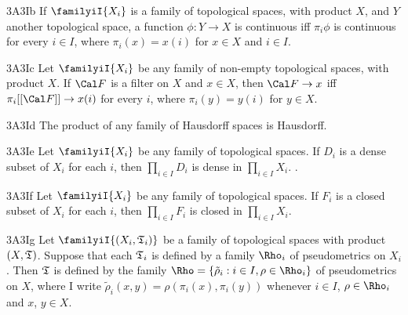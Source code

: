 \spheader 3A3Ib If $\familyiI{X_i}$ is a family of
topological spaces, with product $X$, and $Y$ another topological
space, a function $\phi:Y\to X$ is continuous iff $\pi_i\phi$ is
continuous for every $i\in I$, where $\pi_i(x)=x(i)$ for $x\in X$ and
$i\in I$.   

\spheader 3A3Ic Let $\familyiI{X_i}$ be any family of
non-empty topological spaces, with product $X$.   If $\Cal F$ is a
filter on $X$ and $x\in X$, then $\Cal F\to x$ iff $\pi_i[[\Cal F]]\to
x(i)$ for every $i$, where $\pi_i(y)=y(i)$ for $y\in X$.

\spheader 3A3Id The product of any family of Hausdorff spaces is
Hausdorff.   

\spheader 3A3Ie Let $\familyiI{X_i}$ be any family of
topological spaces.   If $D_i$ is a dense subset of $X_i$ for each $i$,
then $\prod_{i\in I}D_i$ is dense in $\prod_{i\in I}X_i$.
.

\spheader 3A3If Let $\familyiI{X_i}$ be any family of
topological spaces.   If $F_i$ is a closed subset of $X_i$ for each $i$,
then $\prod_{i\in I}F_i$ is closed in $\prod_{i\in I}X_i$.

\spheader 3A3Ig Let $\familyiI{(X_i,\frak T_i)}$ be a family of
topological spaces with product $(X,\frak T)$.   Suppose that each
$\frak T_i$ is defined by a family $\Rho_i$ of pseudometrics on
$X_i$.   Then $\frak T$ is defined by the family
$\Rho=\{\tilde\rho_i:i\in I,\rho\in\Rho_i\}$ of pseudometrics on $X$,
where I write $\tilde\rho_i(x,y)=\rho(\pi_i(x),\pi_i(y))$ whenever
$i\in I$, $\rho\in\Rho_i$ and $x$, $y\in X$.

